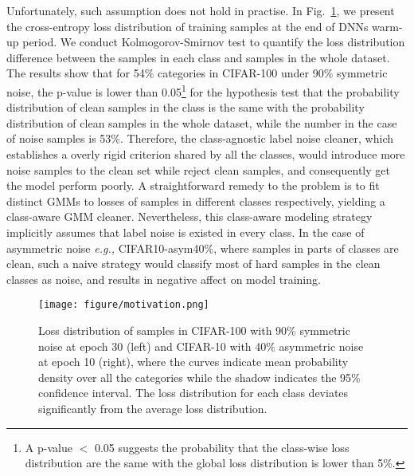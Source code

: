 \documentclass{article} \usepackage{iclr2023_conference,times}
\begin{document}
Unfortunately, such assumption does not hold  in practise. 
In Fig.~\ref{fig:motivation}, 
we present the cross-entropy loss distribution of training samples at the end of DNNs warm-up period. We conduct Kolmogorov-Smirnov test \citep{massey1951kolmogorov} to quantify the loss distribution difference between the samples in each class and samples in the whole dataset. The results show that for 54\%  categories in CIFAR-100 under 90\% symmetric noise, the p-value is lower than 0.05\footnote{A p-value $<$ 0.05 suggests the probability that the class-wise loss distribution are the same with the global loss distribution is lower than 5\%.} for the hypothesis test that the probability distribution of clean samples in the class is the same with the probability distribution of clean samples in the whole dataset, while the number in the case of noise samples is 53\%. Therefore, the class-agnostic label noise cleaner, which establishes a overly rigid criterion shared by all the classes, would introduce more noise samples to the clean set while reject clean samples, and consequently get the model perform poorly. A straightforward remedy to the problem is to fit distinct GMMs to losses of samples in different classes respectively, yielding a class-aware GMM cleaner. Nevertheless, this class-aware modeling strategy implicitly assumes that label noise is existed in every class. In the case of asymmetric noise \emph{e.g.,} CIFAR10-asym40\%, where samples in parts of classes are clean, such a naive strategy would classify most of hard samples in the clean classes as noise, and results in negative affect on model training.
\begin{figure}[t]
  \centering
  \texttt{[image: figure/motivation.png]}
  \caption{ Loss distribution of samples in CIFAR-100 with 90\% symmetric noise at epoch 30 (left)  and CIFAR-10 with 40\% asymmetric noise at epoch 10 (right), where the curves indicate mean probability density over all the categories while the shadow indicates the 95\% confidence interval. The loss distribution for each class deviates significantly from the average loss distribution.}
   \label{fig:motivation}
   \vspace{-1\baselineskip}
\end{figure}
\end{document}
